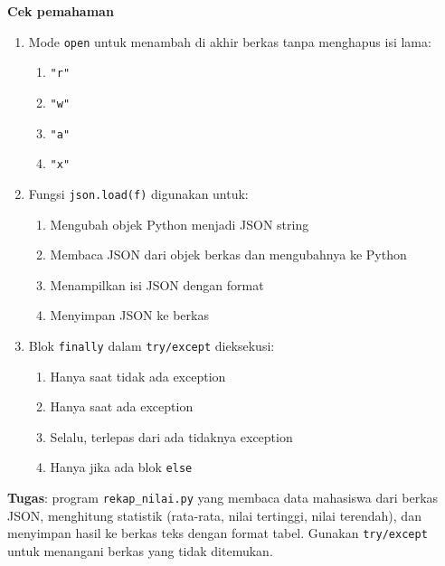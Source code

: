 \documentclass[../main.tex]{subfiles}
\begin{document}
\begin{asesmen}
\textbf{Cek pemahaman}

\begin{enumerate}
  \item Mode \texttt{open} untuk menambah di akhir berkas tanpa menghapus isi lama:
  \begin{enumerate}
    \item \texttt{"r"}
    \item \texttt{"w"}
    \item \texttt{"a"}
    \item \texttt{"x"}
  \end{enumerate}
  \item Fungsi \texttt{json.load(f)} digunakan untuk:
  \begin{enumerate}
    \item Mengubah objek Python menjadi JSON string
    \item Membaca JSON dari objek berkas dan mengubahnya ke Python
    \item Menampilkan isi JSON dengan format
    \item Menyimpan JSON ke berkas
  \end{enumerate}
  \item Blok \texttt{finally} dalam \texttt{try/except} dieksekusi:
  \begin{enumerate}
    \item Hanya saat tidak ada exception
    \item Hanya saat ada exception
    \item Selalu, terlepas dari ada tidaknya exception
    \item Hanya jika ada blok \texttt{else}
  \end{enumerate}
\end{enumerate}

\textbf{Tugas}: program \texttt{rekap\_nilai.py} yang membaca data mahasiswa dari berkas JSON, menghitung statistik (rata-rata, nilai tertinggi, nilai terendah), dan menyimpan hasil ke berkas teks dengan format tabel. Gunakan \texttt{try/except} untuk menangani berkas yang tidak ditemukan.
\end{asesmen}
\end{document}
